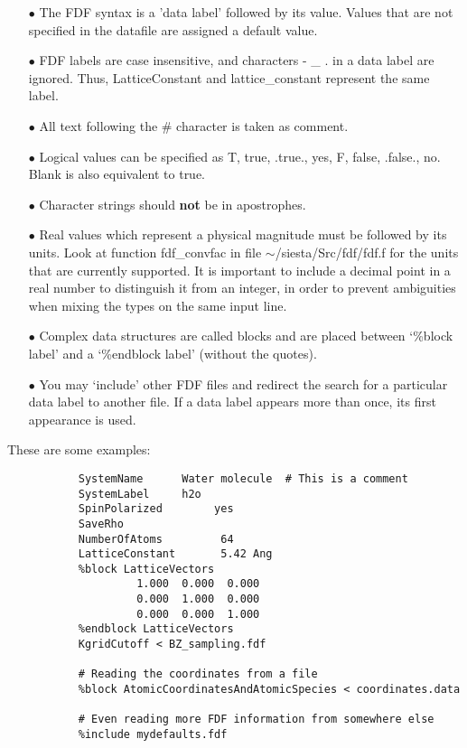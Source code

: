 \documentclass[11pt]{article}
\begin{document}
\begin{itemize}

\item[$\bullet$] The FDF syntax is a 'data label' followed by its value.
Values that are not specified in the datafile are assigned
a default value. 

\item[$\bullet$] FDF labels are case insensitive, and characters - \_ . 
in a data label are ignored. Thus, LatticeConstant and
lattice\_constant represent the same label.

\item[$\bullet$] All text following the \# character is taken as comment.

\item[$\bullet$] Logical values can be specified as T, true, .true.,
yes, F, false, .false., no. Blank is also equivalent to true.

\item[$\bullet$] Character strings should {\bf not} be in apostrophes.

\item[$\bullet$] Real values which represent a physical magnitude must be
followed by its units. Look at function fdf\_convfac in
file $\sim$/siesta/Src/fdf/fdf.f for the units that are currently supported.
It is important to include a decimal point in a real number to distinguish
it from an integer, in order to prevent ambiguities when mixing the types
on the same input line.

\item[$\bullet$] Complex data structures are called blocks and are
placed between `\%block label' and a `\%endblock label' 
(without the quotes).

\item[$\bullet$] You may `include' other FDF files and redirect the search
for a particular data label to another file. 
If a data label appears more than once, its first appearance
is used.

\end{itemize}

\noindent
These are some examples:

\begin{verbatim}
           SystemName      Water molecule  # This is a comment 
           SystemLabel     h2o
           SpinPolarized        yes 
           SaveRho                 
           NumberOfAtoms         64  
           LatticeConstant       5.42 Ang  
           %block LatticeVectors  
                    1.000  0.000  0.000 
                    0.000  1.000  0.000 
                    0.000  0.000  1.000
           %endblock LatticeVectors  
           KgridCutoff < BZ_sampling.fdf 

           # Reading the coordinates from a file 
           %block AtomicCoordinatesAndAtomicSpecies < coordinates.data 

           # Even reading more FDF information from somewhere else
           %include mydefaults.fdf  
\end{verbatim}
\end{document}
